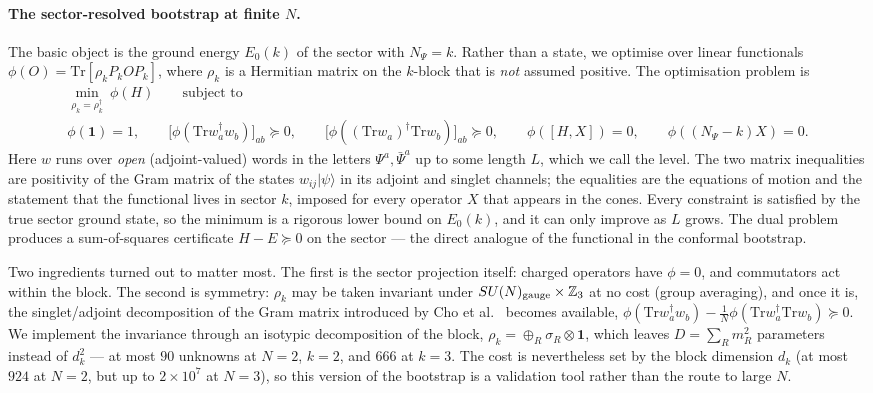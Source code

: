 \documentclass[10pt]{article}
\newcommand{\Tr}{\mathrm{Tr}}
\newcommand{\bPsi}{\bar\Psi}
\begin{document}
\paragraph{The sector-resolved bootstrap at finite $N$.}
The basic object is the ground energy $E_0(k)$ of the sector with $N_\Psi=k$. Rather than a state, we optimise over linear functionals $\phi(O)=\Tr[\rho_k P_kOP_k]$, where $\rho_k$ is a Hermitian matrix on the $k$-block that is \emph{not} assumed positive. The optimisation problem is
\begin{equation}
\boxed{\;\begin{gathered}
\min_{\rho_k=\rho_k^\dagger}\ \phi(H)\qquad\text{subject to}\\[3pt]
\phi(\mathbf 1)=1,\qquad
\big[\phi(\Tr w_a^\dagger w_b)\big]_{ab}\succeq0,\qquad
\big[\phi((\Tr w_a)^\dagger\Tr w_b)\big]_{ab}\succeq0,\qquad
\phi([H,X])=0,\qquad \phi((N_\Psi-k)X)=0 .
\end{gathered}\;}
\label{eq:sdp}
\end{equation}
Here $w$ runs over \emph{open} (adjoint-valued) words in the letters $\Psi^a,\bPsi^a$ up to some length $L$, which we call the level. The two matrix inequalities are positivity of the Gram matrix of the states $w_{ij}|\psi\rangle$ in its adjoint and singlet channels; the equalities are the equations of motion and the statement that the functional lives in sector $k$, imposed for every operator $X$ that appears in the cones. Every constraint is satisfied by the true sector ground state, so the minimum is a rigorous lower bound on $E_0(k)$, and it can only improve as $L$ grows. The dual problem produces a sum-of-squares certificate $H-E\succeq0$ on the sector --- the direct analogue of the functional in the conformal bootstrap.

Two ingredients turned out to matter most. The first is the sector projection itself: charged operators have $\phi=0$, and commutators act within the block. The second is symmetry: $\rho_k$ may be taken invariant under $SU(N)_{\rm gauge}\times\mathbb Z_3$ at no cost (group averaging), and once it is, the singlet/adjoint decomposition of the Gram matrix introduced by Cho et al.~\cite{Cho:2024thermal} becomes available, $\phi(\Tr w_a^\dagger w_b)-\tfrac1N\phi(\Tr w_a^\dagger\Tr w_b)\succeq0$. We implement the invariance through an isotypic decomposition of the block, $\rho_k=\oplus_R\sigma_R\otimes\mathbf 1$, which leaves $D=\sum_Rm_R^2$ parameters instead of $d_k^2$ --- at most $90$ unknowns at $N=2$, $k=2$, and $666$ at $k=3$. The cost is nevertheless set by the block dimension $d_k$ (at most $924$ at $N=2$, but up to $2\times10^7$ at $N=3$), so this version of the bootstrap is a validation tool rather than the route to large $N$.
\end{document}
